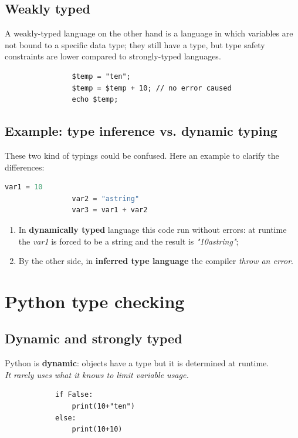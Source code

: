 \documentclass[12pt]{article}
\begin{document}
	\subsection{Weakly typed} 
		A weakly-typed language on the other hand is a language in which variables are not bound to a specific data type; they still have a type, but type safety constraints are lower compared to strongly-typed languages.\\
			\begin{lstlisting}
				$temp = "ten"; 
				$temp = $temp + 10; // no error caused
				echo $temp;
			\end{lstlisting}
			
			
		
	
		\subsection{Example: type inference vs. dynamic typing}
			These two kind of typings could be confused. Here an example to clarify the differences:

			\begin{lstlisting}[language=Python]
				var1 = 10
				var2 = "astring"
				var3 = var1 + var2
			\end{lstlisting}
			
			\begin{enumerate}
				\item In \textbf{dynamically typed} language this code run without errors: at runtime the \textit{var1} is forced to be a string and the result is \textit{"10astring"};
				\item By the other side, in \textbf{inferred type language} the compiler \textit{throw an error}.
			\end{enumerate}
\newpage
\section{Python type checking}
	\subsection{Dynamic and strongly typed}
		Python is \textbf{dynamic}: objects have a type but it is determined at runtime. \\
		\textit{It rarely uses what it knows to limit variable usage.}
		
		\begin{lstlisting}
			if False:
				print(10+"ten") 
			else:
				print(10+10)
		\end{lstlisting}
		
\end{document}
